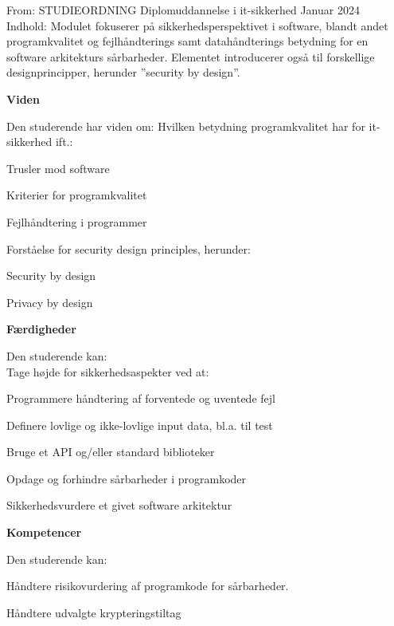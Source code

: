 \documentclass[Screen16to9,17pt]{foils}
\begin{document}



From: STUDIEORDNING Diplomuddannelse i it-sikkerhed Januar 2024\\
Indhold: Modulet fokuserer på sikkerhedsperspektivet i software, blandt andet programkvalitet og
fejlhåndterings samt datahåndterings betydning for en software arkitekturs sårbarheder.
Elementet introducerer også til forskellige designprincipper, herunder ”security by design”.

{\bf Viden}

Den studerende har viden om:
Hvilken betydning programkvalitet har for it-sikkerhed ift.:
\begin{list2}
\item Trusler mod software
\item Kriterier for programkvalitet
\item Fejlhåndtering i programmer
\item Forståelse for security design principles, herunder:
\item Security by design
\item Privacy by design
\end{list2}




{\bf Færdigheder}

Den studerende kan:\\
Tage højde for sikkerhedsaspekter ved at:
\begin{list2}
\item Programmere håndtering af forventede og uventede fejl
\item Definere lovlige og ikke-lovlige input data, bl.a. til test
\item Bruge et API og/eller standard biblioteker
\item Opdage og forhindre sårbarheder i programkoder
\item Sikkerhedsvurdere et givet software arkitektur
\end{list2}

{\bf Kompetencer}

Den studerende kan:
\begin{list2}
\item Håndtere risikovurdering af programkode for sårbarheder.
\item Håndtere udvalgte krypteringstiltag
\end{list2}
\end{document}
